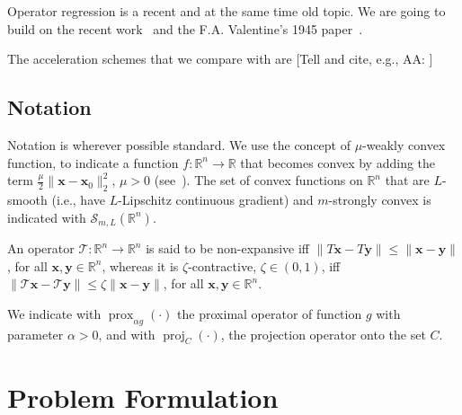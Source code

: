 \documentclass{article}
\DeclareMathOperator{\prox}{prox}
\DeclareMathOperator{\proj}{proj}
\newcommand{\R}{\mathbb{R}}
\newcommand{\x}{\mathbold{x}}
\newcommand{\y}{\mathbold{y}}
\newcommand{\T}{\mathcal{T}}
\newcommand{\andrea}[1]{{\color{red}[#1]}}
\begin{document}
Operator regression is a recent and at the same time old topic. We are going to build on the recent work~\cite{ryu_operator_2020} and the F.A. Valentine's 1945 paper~\cite{valentine_lipschitz_1945}.

The acceleration schemes that we compare with are \andrea{Tell and cite, e.g., AA: \cite{pmlr-v119-mai20a}}

\subsection{Notation}

Notation is wherever possible standard. We use the concept of $\mu$-weakly convex function, to indicate a function $f:\R^n \to \R$ that becomes convex by adding the term $\frac{\mu}{2} \|\x-\x_0\|^2_2$, $\mu >0$ (see~\cite{Duchi2018,Davis2019,pmlr-v119-mai20b}). The set of convex functions on $\R^n$ that are $L$-smooth (i.e., have $L$-Lipschitz continuous gradient) and $m$-strongly convex is indicated with $\mathcal{S}_{m,L}(\R^n)$.

An operator $\T: \R^n \to \R^n$ is said to be non-expansive iff $\|T \x - T \y \| \leq \|\x- \y\|$, for all $\x, \y \in \R^n$, whereas it is $\zeta$-contractive, $\zeta\in(0,1)$, iff $\|\T \x - \T \y \| \leq \zeta \|\x- \y\|$, for all $\x, \y \in \R^n$.

We indicate with $\prox_{\alpha g}(\cdot)$ the proximal operator of function $g$ with parameter $\alpha>0$, and with $\proj_{C}(\cdot)$, the projection operator onto the set $C$. 


\section{Problem Formulation}
\end{document}

